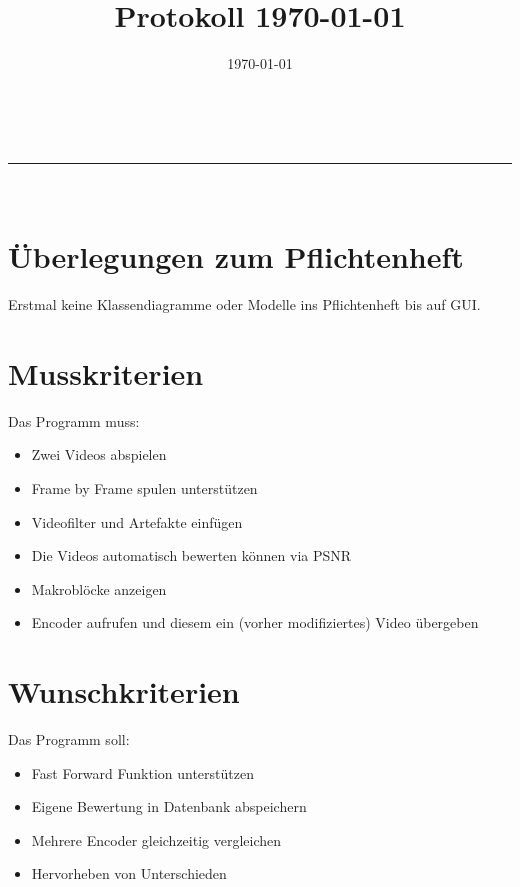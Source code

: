 \documentclass[parskip=full]{scrartcl}
\makeatletter
\newcommand{\linia}{\rule{\linewidth}{0.5pt}}
\theoremstyle{mytheor}
\renewcommand{\maketitle}{
\begin{center}
\vspace{2ex}
{\huge \textsc{\@title}}
\vspace{1ex}
\\
\linia\\
\@author \hfill \@date
\vspace{4ex}
\end{center}
}
\makeatother
\begin{document}
\title{Protokoll \today}
\date{\today}

\maketitle

\section{Überlegungen zum Pflichtenheft}

Erstmal keine Klassendiagramme oder Modelle ins Pflichtenheft bis auf GUI. 


\section{Musskriterien}
Das Programm muss:

\begin{itemize}
\item Zwei Videos abspielen
\item Frame by Frame spulen unterstützen
\item Videofilter und Artefakte einfügen
\item Die Videos automatisch bewerten können via PSNR
\item Makroblöcke anzeigen
\item Encoder aufrufen und diesem ein (vorher modifiziertes) Video übergeben
\end{itemize}

\section{Wunschkriterien}
Das Programm soll:
\begin{itemize}
\item Fast Forward Funktion unterstützen
\item Eigene Bewertung in Datenbank abspeichern
\item Mehrere Encoder gleichzeitig vergleichen
\item Hervorheben von Unterschieden
\end{itemize}
\end{document}
